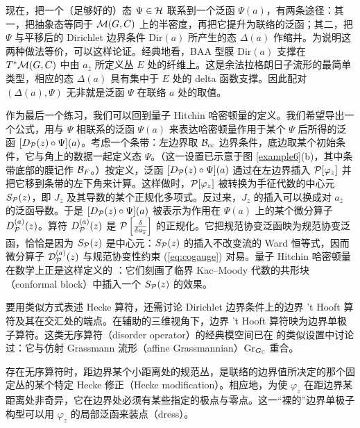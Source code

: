 现在，把一个（足够好的）态 $\Psi \in \H$ 联系到一个泛函 $\Psi(a)$，有两条途径：其一，把抽象态等同于 $\M(G,C)$ 上的半密度，再把它提升为联络的泛函；其二，把 $\Psi$ 与平移后的 Dirichlet 边界条件 $\mathrm{Dir}(a)$ 所产生的态 $\Delta(a)$ 作缩并。为说明这两种做法等价，可以这样论证。经典地看，BAA 型膜 $\mathrm{Dir}(a)$ 支撑在 $T^*\M(G,C)$ 中由 $a_{\bar z}$ 所定义丛 $E$ 处的纤维上。这是余法拉格朗日子流形的最简单类型，相应的态 $\Delta(a)$ 具有集中于 $E$ 处的 delta 函数支撑。因此配对 $ (\Delta(a), \Psi)$ 无非就是泛函 $\Psi$ 在联络 $a$ 处的取值。

作为最后一个练习，我们可以回到量子 Hitchin 哈密顿量的定义。我们希望导出一个公式，用与 $\Psi$ 相联系的泛函 $\Psi(a)$ 来表达哈密顿量作用于某个 $\Psi$ 后所得的泛函 $[\D_\P(z) \circ \Psi](a)$。考虑一个条带：左边界取 $\B_\cc$ 边界条件，底边取某个初始条件，它与角上的数据一起定义态 $\Psi$。（这一设置已示意于图 \ref{example6}(b)，其中条带底部的膜记作 $\B_F$。）按定义，泛函 $[\D_\P(z) \circ \Psi](a)$ 通过在左边界插入 $\P[\varphi_z]$ 并把它移到条带的左下角来计算。这样做时，$\P[\varphi_z]$ 被转换为手征代数的中心元 $S_{\P}(z)$，即 $J_z$ 及其导数的某个正规化多项式。反过来，$J_z$ 的插入可以换成对 $a_{\bar z}$ 的泛函导数。于是 $[\D_\P(z) \circ \Psi](a)$ 被表示为作用在 $\Psi(a)$ 上的某个微分算子 $\D^{(a)}_\P(z)$。算符 $\D^{(a)}_\P(z)$ 是 $\P\left[\frac{\delta}{\delta a_{\bar z}} \right]$ 的正规化。它把规范协变泛函映为规范协变泛函，恰恰是因为 $S_{\P}(z)$ 是中心元：$S_{\P}(z)$ 的插入不改变流的 Ward 恒等式，因而微分算子 ${\cal D}^{(a)}_{\P}(z)$ 与规范协变性约束 (\ref{eq:cogauge}) 对易。量子 Hitchin 哈密顿量在数学上正是这样定义的 \cite{BD}：它们刻画了临界 Kac–Moody 代数的共形块（conformal block）中插入一个 $S_{\P}(z)$ 的效果。

要用类似方式表述 Hecke 算符，还需讨论 Dirichlet 边界条件上的边界 't Hooft 算符及其在交汇处的端点。在辅助的三维视角下，边界 't Hooft 算符映为边界单极子算符。这类无序算符（disorder operator）的经典模空间已在 \cite{Costello:2020ndc} 的类似设置中讨论过：它与仿射 Grassmann 流形（affine Grassmannian）$\Gr_{G_\C}$ 重合。

存在无序算符时，距边界某个小距离处的规范丛，是联络的边界值所决定的那个固定丛的某个特定 Hecke 修正（Hecke modification）。相应地，为使 $\varphi_z$ 在距边界某距离处非奇异，它在边界处必须有某些指定的极点与零点。这一“裸的”边界单极子构型可以用 $\varphi_z$ 的局部泛函来装点（dress）。

